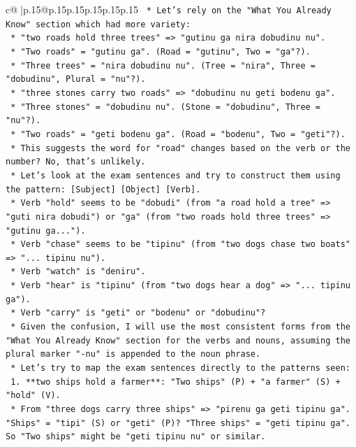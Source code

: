 \documentclass{article}
\begin{document}
{\begin{supertabular}{c@{$\;$}|p{.15\linewidth}@{}p{.15\linewidth}p{.15\linewidth}p{.15\linewidth}p{.15\linewidth}p{.15\linewidth}}
{{{\texttt{        *   Let's rely on the "What You Already Know" section which had more variety:} \\
\texttt{            *   "two roads hold three trees" => "gutinu ga nira dobudinu nu".} \\
\texttt{                *   "Two roads" = "gutinu ga". (Road = "gutinu", Two = "ga"?).} \\
\texttt{                *   "Three trees" = "nira dobudinu nu". (Tree = "nira", Three = "dobudinu", Plural = "nu"?).} \\
\texttt{            *   "three stones carry two roads" => "dobudinu nu geti bodenu ga".} \\
\texttt{                *   "Three stones" = "dobudinu nu". (Stone = "dobudinu", Three = "nu"?).} \\
\texttt{                *   "Two roads" = "geti bodenu ga". (Road = "bodenu", Two = "geti"?).} \\
\texttt{        *   This suggests the word for "road" changes based on the verb or the number? No, that's unlikely.} \\
\texttt{        *   Let's look at the exam sentences and try to construct them using the pattern: {[}Subject{]} {[}Object{]} {[}Verb{]}.} \\
\texttt{        *   Verb "hold" seems to be "dobudi" (from "a road hold a tree" => "guti nira dobudi") or "ga" (from "two roads hold three trees" => "gutinu ga...").} \\
\texttt{        *   Verb "chase" seems to be "tipinu" (from "two dogs chase two boats" => "... tipinu nu").} \\
\texttt{        *   Verb "watch" is "deniru".} \\
\texttt{        *   Verb "hear" is "tipinu" (from "two dogs hear a dog" => "... tipinu ga").} \\
\texttt{        *   Verb "carry" is "geti" or "bodenu" or "dobudinu"?} \\
\texttt{        *   Given the confusion, I will use the most consistent forms from the "What You Already Know" section for the verbs and nouns, assuming the plural marker "{-}nu" is appended to the noun phrase.} \\
\texttt{        *   Let's try to map the exam sentences directly to the patterns seen:} \\
\texttt{            1.  **two ships hold a farmer**: "Two ships" (P) + "a farmer" (S) + "hold" (V).} \\
\texttt{                *   From "three dogs carry three ships" => "pirenu ga geti tipinu ga". "Ships" = "tipi" (S) or "geti" (P)? "Three ships" = "geti tipinu ga". So "Two ships" might be "geti tipinu nu" or similar.} \\
}}}
\end{supertabular}}
\end{document}
